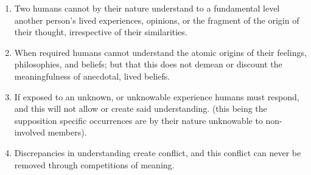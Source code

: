 \documentclass{article}
\begin{document}
        \begin{enumerate}
        \item Two humans cannot by their nature understand to a fundamental level another person's lived experiences, opinions, or the fragment of the origin of their thought, irrespective of their similarities.
        
        \item When required humans cannot understand the atomic origins of their feelings, philosophies, and beliefs; but that this does not demean or discount the meaningfulness of anecdotal, lived beliefs.
        
        \item If exposed to an unknown, or unknowable experience humans must respond, and this will not allow or create said understanding. (this being the supposition specific occurrences are by their nature unknowable to non-involved members).
        
        \item Discrepancies in understanding create conflict, and this conflict can never be removed through competitions of meaning.
        
    \end{enumerate}

    \bigskip
        
\end{document}
